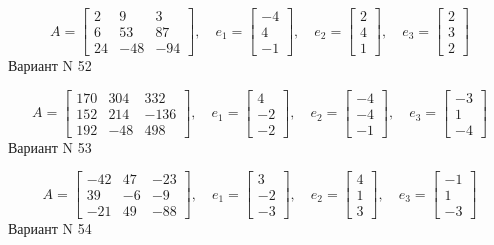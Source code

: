 \documentclass[11pt]{report}
\begin{document}
$$A = \left[\begin{matrix}2 & 9 & 3\\6 & 53 & 87\\24 & -48 & -94\end{matrix}\right],\quad e_1 = \left[\begin{matrix}-4\\4\\-1\end{matrix}\right],\quad e_2 = \left[\begin{matrix}2\\4\\1\end{matrix}\right],\quad e_3 = \left[\begin{matrix}2\\3\\2\end{matrix}\right]$$Вариант N 52

$$A = \left[\begin{matrix}170 & 304 & 332\\152 & 214 & -136\\192 & -48 & 498\end{matrix}\right],\quad e_1 = \left[\begin{matrix}4\\-2\\-2\end{matrix}\right],\quad e_2 = \left[\begin{matrix}-4\\-4\\-1\end{matrix}\right],\quad e_3 = \left[\begin{matrix}-3\\1\\-4\end{matrix}\right]$$Вариант N 53

$$A = \left[\begin{matrix}-42 & 47 & -23\\39 & -6 & -9\\-21 & 49 & -88\end{matrix}\right],\quad e_1 = \left[\begin{matrix}3\\-2\\-3\end{matrix}\right],\quad e_2 = \left[\begin{matrix}4\\1\\3\end{matrix}\right],\quad e_3 = \left[\begin{matrix}-1\\1\\-3\end{matrix}\right]$$Вариант N 54
\end{document}
